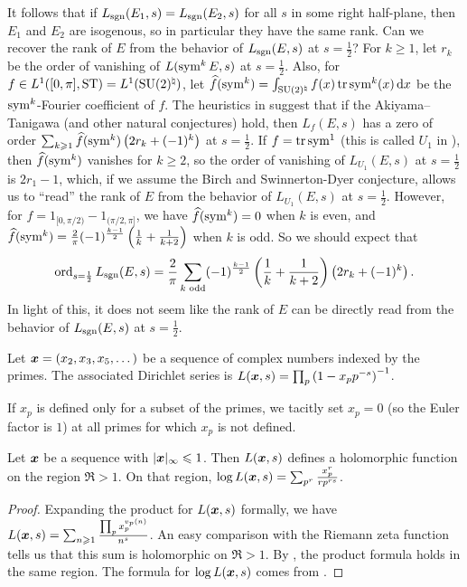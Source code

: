 It follows that if $L_{\operatorname{sgn}}(E_1,s) = L_{\operatorname{sgn}}(E_2,s)$ for all $s$ in some 
right half-plane, then $E_1$ and $E_2$ 
are isogenous, so in particular they have the same rank. Can we recover the 
rank of $E$ from the behavior of $L_{\operatorname{sgn}}(E,s)$ at $s = \frac 1 2$? For 
$k\geqslant 1$, let $r_k$ be the order of vanishing of $L(\operatorname{sym}^k E,s)$ at 
$s = \frac 1 2$. Also, for $f\in L^1([0,\pi],\mathrm{ST}) = L^1(\operatorname{SU}(2)^\natural)$, let 
$\widehat f(\operatorname{sym}^k) = \int_{\operatorname{SU}(2)^\natural} f(x) \operatorname{tr}\operatorname{sym}^k(x)\, \mathrm{d} x$ be the 
$\operatorname{sym}^k$-Fourier coefficient of $f$. The heuristics in \cite{sarnak-2007} 
suggest that if the Akiyama--Tanigawa (and other natural conjectures) hold, 
then $L_f(E,s)$ has a zero of order 
$\sum_{k\geqslant 1} \widehat f(\operatorname{sym}^k) \left(2 r_k + (-1)^k\right)$ at 
$s = \frac 1 2$.  If $f = \operatorname{tr}\operatorname{sym}^1$ (this is called $U_1$ in 
\cite{sarnak-2007}), then $\widehat f(\operatorname{sym}^k)$ vanishes for $k\geqslant 2$, so 
the order of vanishing of $L_{U_1}(E,s)$ at $s = \frac 1 2$ is $2 r_1 - 1$, 
which, if we assume the Birch and Swinnerton-Dyer conjecture, allows us to 
``read'' the rank of $E$ from the behavior of $L_{U_1}(E,s)$ at 
$s = \frac 1 2$. However, for $f = 1_{[0,\pi/2)} - 1_{(\pi/2,\pi]}$, we have 
$\widehat f(\operatorname{sym}^k) = 0$ when $k$ is even, and 
$\widehat f(\operatorname{sym}^k) = \frac 2 \pi (-1)^{\frac{k-1}{2}} \left(\frac 1 k + \frac{1}{k+2}\right)$ when $k$ is odd. So we should expect that
\[
	\operatorname{ord}_{s = \frac 1 2} L_{\operatorname{sgn}}(E,s) = \frac 2 \pi\sum_{k\text{ odd}}(-1)^{\frac{k-1}{2}} \left(\frac 1 k + \frac{1}{k+2}\right)\left(2 r_k + (-1)^k\right) .
\] 
In light of this, it does not seem like the rank of $E$ can be directly read 
from the behavior of $L_{\operatorname{sgn}}(E,s)$ at $s = \frac 1 2$. 

\begin{definition}
Let ${\boldsymbol x}=(x_2,x_3,x_5,\dots)$ be a sequence of complex numbers indexed by the 
primes. The associated Dirichlet series is 
$L({\boldsymbol x},s) = \prod_p \left(1- x_p p^{-s}\right)^{-1}$. 
\end{definition}

If $x_p$ is defined only for a subset of the primes, we tacitly set $x_p = 0$ 
(so the Euler factor is $1$) at all primes for which $x_p$ is not defined. 

\begin{lemma}
Let ${\boldsymbol x}$ be a sequence with $|{\boldsymbol x}|_\infty \leqslant 1$. Then $L({\boldsymbol x},s)$ 
defines a holomorphic function on the region $\Re > 1$. On that region, 
$\log L({\boldsymbol x},s) = \sum_{p^r} \frac{x_p^r}{r p^{r s}}$. 
\end{lemma}
\begin{proof}
Expanding the product for $L({\boldsymbol x},s)$ formally, we have 
$L({\boldsymbol x},s) = \sum_{n\geqslant 1} \frac{\prod_p x_p^{v_p(n)}}{n^s}$. 
An easy comparison with the Riemann zeta function tells us that this sum 
is holomorphic on $\Re > 1$. By \cite[Th.~11.7]{apostol-1976}, the 
product formula holds in the same region. The formula for $\log L({\boldsymbol x},s)$ 
comes from \cite[11.9 Ex.~2]{apostol-1976}. 
\end{proof}

